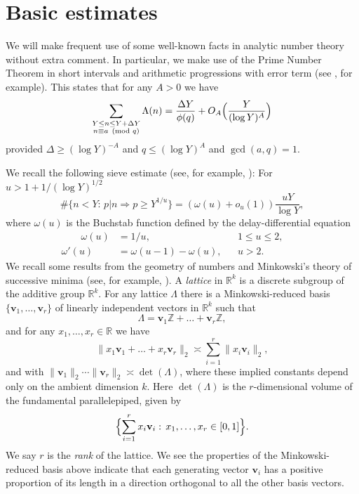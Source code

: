 \documentclass[10pt]{amsart}
\theoremstyle{plain}
\numberwithin{sblmm}{thrm}
\numberwithin{equation}{section}
\begin{document}
\section{Basic estimates}
%
%
%
We will make frequent use of some well-known facts in analytic number theory without extra comment. In particular, we make use of the Prime Number Theorem in short intervals and arithmetic progressions with error term (see \cite[Chapter 22]{Davenport}, for example). This states that for any $A>0$ we have
%
\begin{equation}
\sum_{\substack{Y\le n\le Y+\Delta Y\\ n\equiv a\pmod{q}}}\Lambda(n)=\frac{\Delta Y}{\phi(q)}+O_A\Bigl(\frac{Y}{(\log{Y})^A}\Bigr)
\label{eq:PNT}
\end{equation}
%
provided $\Delta\ge (\log{Y})^{-A}$ and $q\le (\log{Y})^A$ and $\gcd(a,q)=1$.

We recall the following sieve estimate (see, for example, \cite[Theorem 7.11]{MontgomeryVaughan}): For $u>1+1/(\log{Y})^{1/2}$
%
\begin{equation}
\#\{n<Y:\,p|n\Rightarrow p\ge Y^{1/u}\}=(\omega(u)+o_u(1))\frac{u Y}{\log{Y}},
\label{eq:Buchstab}
\end{equation}
%
where $\omega(u)$ is the Buchstab function defined by the delay-differential equation
%
\begin{align*}
\qquad\omega(u)&=1/u, &&1\le u\le 2,\qquad\\
\omega'(u)&=\omega(u-1)-\omega(u), &&u>2.
\end{align*}
%
We recall some results from the geometry of numbers and Minkowski's theory of successive minima (see, for example, \cite[Page 110]{DavenportGeom}). A \textit{lattice} in $\mathbb{R}^k$ is a discrete subgroup of the additive group $\mathbb{R}^k$. For any lattice $\Lambda$ there is a Minkowski-reduced basis $\{\mathbf{v}_1,\dots,\mathbf{v}_r\}$ of linearly independent vectors in $\mathbb{R}^k$ such that
\[
\Lambda=\mathbf{v}_1\mathbb{Z}+\dots+\mathbf{v}_r\mathbb{Z},
\]
and for any $x_1,\dots,x_r\in\mathbb{R}$ we have
\[
\|x_1\mathbf{v}_1+\dots+x_r\mathbf{v}_r\|_2\asymp \sum_{i=1}^r\|x_i\mathbf{v}_i\|_2,
\]
and with $\|\mathbf{v}_1\|_2\cdots\|\mathbf{v}_r\|_2\asymp \det(\Lambda)$, where these implied constants depend only on the ambient dimension $k$. Here $\det(\Lambda)$ is the $r$-dimensional volume of the fundamental parallelepiped, given by
\[
\Bigl\{\sum_{i=1}^r x_i\mathbf{v}_i:\,x_1,\dots,x_r\in[0,1]\Bigr\}.
\]
We say $r$ is the \textit{rank} of the lattice. We see the properties of the Minkowski-reduced basis above indicate that each generating vector $\mathbf{v}_i$ has a positive proportion of its length in a direction orthogonal to all the other basis vectors.
%
%
%
%
%
%
\end{document}
